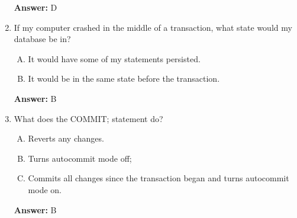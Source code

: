 \documentclass[12pt]{article}
\begin{document}
\begin{enumerate}[1.]
    \textbf{Answer:} D

    \item

    If my computer crashed in the middle of a transaction, what state would my database be in?

    \bigskip

    \begin{enumerate}[A.]
        \item It would have some of my statements persisted.
        \item It would be in the same state before the transaction.
    \end{enumerate}

    \bigskip

    \textbf{Answer:} B

    \item

    What does the COMMIT; statement do?

    \bigskip

    \begin{enumerate}[A.]
        \item Reverts any changes.
        \item Turns autocommit mode off;
        \item Commits all changes since the transaction began and turns autocommit mode on.
    \end{enumerate}

    \bigskip

    \textbf{Answer:} B

\end{enumerate}
\end{document}
